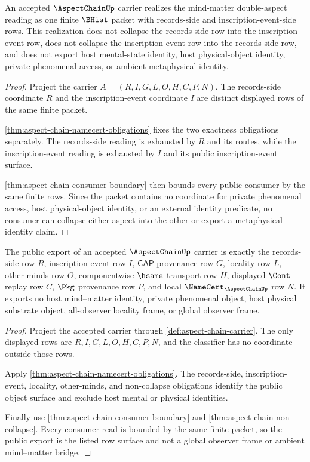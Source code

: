 \begin{theorem}
\label{thm:aspect-chain-non-collapse}
An accepted $\AspectChainUp$ carrier realizes the mind-matter double-aspect reading as one finite $\BHist$ packet with records-side and inscription-event-side rows. This realization does not collapse the records-side row into the inscription-event row, does not collapse the inscription-event row into the records-side row, and does not export host mental-state identity, host physical-object identity, private phenomenal access, or ambient metaphysical identity.
\end{theorem}
\begin{proof}
Project the carrier $A=(R,I,G,L,O,H,C,P,N)$. The records-side coordinate $R$ and the inscription-event coordinate $I$ are distinct displayed rows of the same finite packet.

\autoref{thm:aspect-chain-namecert-obligations} fixes the two exactness obligations separately. The records-side reading is exhausted by $R$ and its routes, while the inscription-event reading is exhausted by $I$ and its public inscription-event surface.

\autoref{thm:aspect-chain-consumer-boundary} then bounds every public consumer by the same finite rows. Since the packet contains no coordinate for private phenomenal access, host physical-object identity, or an external identity predicate, no consumer can collapse either aspect into the other or export a metaphysical identity claim.
\end{proof}

\begin{theorem}
\label{thm:aspect-chain-public-export}
The public export of an accepted $\AspectChainUp$ carrier is exactly the records-side row $R$, inscription-event row $I$, $\mathsf{GAP}$ provenance row $G$, locality row $L$, other-minds row $O$, componentwise $\hsame$ transport row $H$, displayed $\Cont$ replay row $C$, $\Pkg$ provenance row $P$, and local $\NameCert_{\AspectChainUp}$ row $N$. It exports no host mind--matter identity, private phenomenal object, host physical substrate object, all-observer locality frame, or global observer frame.
\end{theorem}
\begin{proof}
Project the accepted carrier through \autoref{def:aspect-chain-carrier}. The only displayed rows are $R,I,G,L,O,H,C,P,N$, and the classifier has no coordinate outside those rows.

Apply \autoref{thm:aspect-chain-namecert-obligations}. The records-side, inscription-event, locality, other-minds, and non-collapse obligations identify the public object surface and exclude host mental or physical identities.

Finally use \autoref{thm:aspect-chain-consumer-boundary} and \autoref{thm:aspect-chain-non-collapse}. Every consumer read is bounded by the same finite packet, so the public export is the listed row surface and not a global observer frame or ambient mind--matter bridge.
\end{proof}

